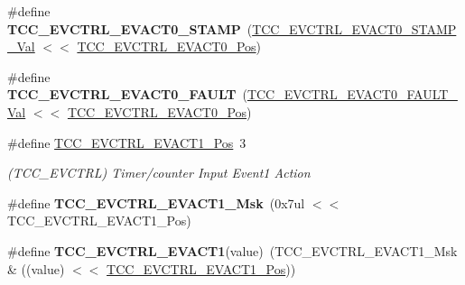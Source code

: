 \begin{DoxyCompactItemize}
\item 
\hypertarget{group___s_a_m_l21___t_c_c_ga37230d710e4ca448ac4c12f09b0de325}{}\#define {\bfseries T\+C\+C\+\_\+\+E\+V\+C\+T\+R\+L\+\_\+\+E\+V\+A\+C\+T0\+\_\+\+S\+T\+A\+M\+P}~(\hyperlink{group___s_a_m_l21___t_c_c_ga69e3329e1956b2a040fe1243d3399d7a}{T\+C\+C\+\_\+\+E\+V\+C\+T\+R\+L\+\_\+\+E\+V\+A\+C\+T0\+\_\+\+S\+T\+A\+M\+P\+\_\+\+Val}   $<$$<$ \hyperlink{group___s_a_m_l21___t_c_c_gaa3e2449eae58d3ef88f4cf52816c4c20}{T\+C\+C\+\_\+\+E\+V\+C\+T\+R\+L\+\_\+\+E\+V\+A\+C\+T0\+\_\+\+Pos})\label{group___s_a_m_l21___t_c_c_ga37230d710e4ca448ac4c12f09b0de325}

\item 
\hypertarget{group___s_a_m_l21___t_c_c_ga3836ed95a47243090e92dac9f7d8e19f}{}\#define {\bfseries T\+C\+C\+\_\+\+E\+V\+C\+T\+R\+L\+\_\+\+E\+V\+A\+C\+T0\+\_\+\+F\+A\+U\+L\+T}~(\hyperlink{group___s_a_m_l21___t_c_c_ga3dd28317ca3247349e572fa966ece270}{T\+C\+C\+\_\+\+E\+V\+C\+T\+R\+L\+\_\+\+E\+V\+A\+C\+T0\+\_\+\+F\+A\+U\+L\+T\+\_\+\+Val}   $<$$<$ \hyperlink{group___s_a_m_l21___t_c_c_gaa3e2449eae58d3ef88f4cf52816c4c20}{T\+C\+C\+\_\+\+E\+V\+C\+T\+R\+L\+\_\+\+E\+V\+A\+C\+T0\+\_\+\+Pos})\label{group___s_a_m_l21___t_c_c_ga3836ed95a47243090e92dac9f7d8e19f}

\item 
\hypertarget{group___s_a_m_l21___t_c_c_gada1f071c882b1c68121a6d6db44527e2}{}\#define \hyperlink{group___s_a_m_l21___t_c_c_gada1f071c882b1c68121a6d6db44527e2}{T\+C\+C\+\_\+\+E\+V\+C\+T\+R\+L\+\_\+\+E\+V\+A\+C\+T1\+\_\+\+Pos}~3\label{group___s_a_m_l21___t_c_c_gada1f071c882b1c68121a6d6db44527e2}

\begin{DoxyCompactList}\small\item\em (T\+C\+C\+\_\+\+E\+V\+C\+T\+R\+L) Timer/counter Input Event1 Action \end{DoxyCompactList}\item 
\hypertarget{group___s_a_m_l21___t_c_c_ga43928862555c350b08f6ac85b3390837}{}\#define {\bfseries T\+C\+C\+\_\+\+E\+V\+C\+T\+R\+L\+\_\+\+E\+V\+A\+C\+T1\+\_\+\+Msk}~(0x7ul $<$$<$ T\+C\+C\+\_\+\+E\+V\+C\+T\+R\+L\+\_\+\+E\+V\+A\+C\+T1\+\_\+\+Pos)\label{group___s_a_m_l21___t_c_c_ga43928862555c350b08f6ac85b3390837}

\item 
\hypertarget{group___s_a_m_l21___t_c_c_ga0b588a69bf6efc4b5fa33dcfa6516bb2}{}\#define {\bfseries T\+C\+C\+\_\+\+E\+V\+C\+T\+R\+L\+\_\+\+E\+V\+A\+C\+T1}(value)~(T\+C\+C\+\_\+\+E\+V\+C\+T\+R\+L\+\_\+\+E\+V\+A\+C\+T1\+\_\+\+Msk \& ((value) $<$$<$ \hyperlink{group___s_a_m_l21___t_c_c_gada1f071c882b1c68121a6d6db44527e2}{T\+C\+C\+\_\+\+E\+V\+C\+T\+R\+L\+\_\+\+E\+V\+A\+C\+T1\+\_\+\+Pos}))\label{group___s_a_m_l21___t_c_c_ga0b588a69bf6efc4b5fa33dcfa6516bb2}


\end{DoxyCompactItemize}
